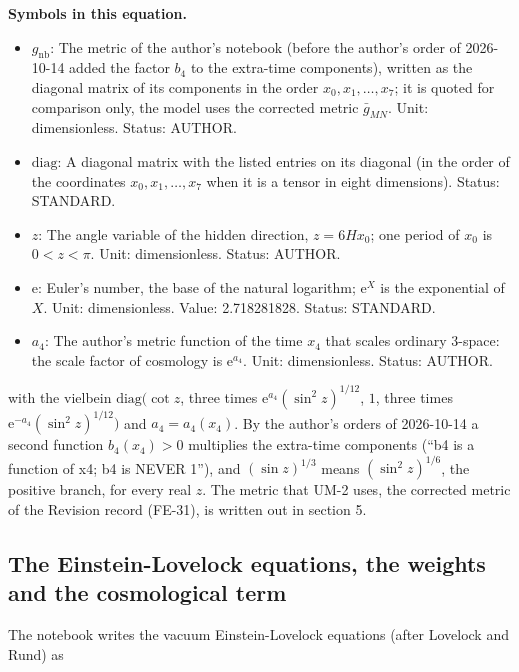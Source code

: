 \documentclass[
  10pt,
]{article}
\providecommand{\tightlist}{%
  \setlength{\itemsep}{0pt}\setlength{\parskip}{0pt}}
\begin{document}
\textbf{Symbols in this equation.}

\begin{itemize}
\tightlist
\item
  \(g_{\mathrm{nb}}\): The metric of the author's notebook (before the
  author's order of 2026-10-14 added the factor \(b_4\) to the
  extra-time components), written as the diagonal matrix of its
  components in the order \(x_0, x_1, \dots, x_7\); it is quoted for
  comparison only, the model uses the corrected metric \(\bar g_{MN}\).
  Unit: dimensionless. Status: AUTHOR.
\item
  \(\mathrm{diag}\): A diagonal matrix with the listed entries on its
  diagonal (in the order of the coordinates \(x_0, x_1, \dots, x_7\)
  when it is a tensor in eight dimensions). Status: STANDARD.
\item
  \(z\): The angle variable of the hidden direction, \(z = 6Hx_0\); one
  period of \(x_0\) is \(0 < z < \pi\). Unit: dimensionless. Status:
  AUTHOR.
\item
  \(\mathrm{e}\): Euler's number, the base of the natural logarithm;
  \(\mathrm{e}^{X}\) is the exponential of \(X\). Unit: dimensionless.
  Value: 2.718281828. Status: STANDARD.
\item
  \(a_4\): The author's metric function of the time \(x_4\) that scales
  ordinary 3-space: the scale factor of cosmology is
  \(\mathrm{e}^{a_4}\). Unit: dimensionless. Status: AUTHOR.
\end{itemize}

with the vielbein \(\mathrm{diag}\big(\cot z\), three times
\(\mathrm{e}^{a_4}(\sin^2z)^{1/12}\), \(1\), three times
\(\mathrm{e}^{-a_4}(\sin^2z)^{1/12}\big)\) and \(a_4 = a_4(x_4)\). By
the author's orders of 2026-10-14 a second function \(b_4(x_4) > 0\)
multiplies the extra-time components (``b4 is a function of x4; b4 is
NEVER 1''), and \((\sin z)^{1/3}\) means \((\sin^2z)^{1/6}\), the
positive branch, for every real \(z\). The metric that UM-2 uses, the
corrected metric of the Revision record (FE-31), is written out in
section 5.

\hypertarget{the-einstein-lovelock-equations-the-weights-and-the-cosmological-term}{%
\subsection{The Einstein-Lovelock equations, the weights and the
cosmological
term}\label{the-einstein-lovelock-equations-the-weights-and-the-cosmological-term}}

The notebook writes the vacuum Einstein-Lovelock equations (after
Lovelock and Rund) as
\end{document}
